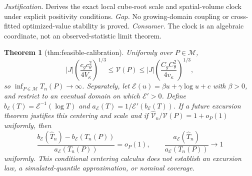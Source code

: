 \documentclass{article}
\newtheorem{theorem}{Theorem}
\begin{document}
\par\smallskip\noindent \textit{Justification.} Derives the exact local cube-root scale and spatial-volume clock under explicit positivity conditions. \textit{Gap.} No growing-domain coupling or cross-fitted optimized-value stability is proved. \textit{Consumer.} The clock is an algebraic coordinate, not an observed-statistic limit theorem.

\begin{theorem}[thm:feasible-calibration]\label{thm:feasible-calibration}
Uniformly over \(P\in\mathcal M\),
\[
 |J|\left(\frac{c_gc_\theta^2}{4V_\kappa}\right)^{1/3}
 \le\mathcal V(P)\le
 |J|\left(\frac{C_gC_\theta^2}{4v_\kappa}\right)^{1/3},
\]
so \(\inf_{P\in\mathcal M}T_n(P)\to\infty\). Separately, let \(\mathcal E(u)=\beta u+\gamma\log u+c\) with \(\beta>0\), and restrict to an eventual domain on which \(\mathcal E'>0\). Define \(b_{\mathcal E}(T)=\mathcal E^{-1}(\log T)\) and \(a_{\mathcal E}(T)=1/\mathcal E'(b_{\mathcal E}(T))\). If a future excursion theorem justifies this centering and scale and if \(\widehat{\mathcal V}_n/\mathcal V(P)=1+o_P(1)\) uniformly, then
\[
 \frac{b_{\mathcal E}(\widehat T_n)-b_{\mathcal E}(T_n(P))}{a_{\mathcal E}(T_n(P))}=o_P(1),
 \qquad
 \frac{a_{\mathcal E}(\widehat T_n)}{a_{\mathcal E}(T_n(P))}\to1
\]
uniformly. This conditional centering calculus does not establish an excursion law, a simulated-quantile approximation, or nominal coverage.
\end{theorem}
\end{document}
